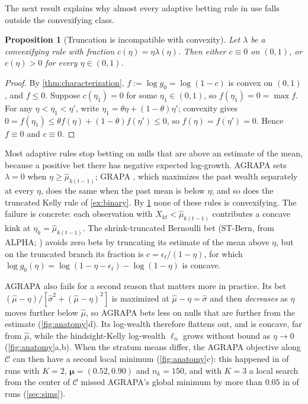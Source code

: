 \documentclass[11pt]{article}
\newcommand{\bs}{\boldsymbol}
\newcommand{\calC}{\mathcal{C}}
\theoremstyle{plain}
\newtheorem{proposition}[theorem]{Proposition}
\theoremstyle{definition}
\theoremstyle{remark}
\begin{document}
The next result explains why almost every adaptive betting rule in use falls outside the convexifying class.

\begin{proposition}[Truncation is incompatible with convexity]\label{prop:truncation}
Let $\lambda$ be a convexifying rule with fraction $c(\eta)=\eta\lambda(\eta)$.  Then either $c\equiv0$ on $(0,1)$, or
$c(\eta)>0$ for every $\eta\in(0,1)$.
\end{proposition}

\begin{proof}
By \cref{thm:characterization}, $f := \log g_0 = \log(1-c)$ is convex on $(0,1)$, and $f\le0$.  Suppose $c(\eta_1)=0$
for some $\eta_1\in(0,1)$, so $f(\eta_1)=0=\max f$.  For any $\eta<\eta_1<\eta'$, write $\eta_1=\theta\eta+(1-\theta)\eta'$;
convexity gives $0=f(\eta_1)\le\theta f(\eta)+(1-\theta)f(\eta')\le0$, so $f(\eta)=f(\eta')=0$.  Hence $f\equiv0$ and
$c\equiv0$.
\end{proof}

Most adaptive rules stop betting on nulls that are above an estimate of the mean, because a positive bet there has
negative expected log-growth.  AGRAPA \citep{waudbysmith2024estimating} sets $\lambda=0$ when
$\eta\ge\hat\mu_{k(t-1)}$; GRAPA \citep{kumon2011sequential, waudbysmith2024estimating}, which maximizes the past
wealth separately at every $\eta$, does the same when the past mean is below $\eta$; and so does the truncated Kelly
rule of \cref{ex:binary}.  By \cref{prop:truncation} none of these rules is convexifying.  The failure is concrete:
each observation with $X_{kt}<\hat\mu_{k(t-1)}$ contributes a concave kink at $\eta_k=\hat\mu_{k(t-1)}$.  The
shrink-truncated Bernoulli bet (ST-Bern, from ALPHA; \citealp{stark2023alpha}) avoids zero bets by truncating its
estimate of the mean above $\eta$, but on the truncated branch its fraction is $c=\epsilon_t/(1-\eta)$, for which
$\log g_0(\eta)=\log(1-\eta-\epsilon_t)-\log(1-\eta)$ is concave.

AGRAPA also fails for a second reason that matters more in practice.  Its bet
$(\hat\mu-\eta)/[\hat\sigma^2+(\hat\mu-\eta)^2]$ is maximized at $\hat\mu-\eta=\hat\sigma$ and then \emph{decreases} as
$\eta$ moves further below $\hat\mu$, so AGRAPA bets less on nulls that are further from the estimate
(\cref{fig:anatomy}d).  Its log-wealth therefore flattens out, and is concave, far from $\hat\mu$, while the
hindsight-Kelly log-wealth $\ell_n$ grows without bound as $\eta\to0$ (\cref{fig:anatomy}a,b).  When the stratum means
differ, the AGRAPA objective along $\calC$ can then have a second local minimum (\cref{fig:anatomy}c): this happened in
\agrapalocalminshare{} of \repsE{} runs with $K=2$, $\bs\mu=(0.52,0.90)$ and $n_k=150$, and with $K=3$ a local search from
the center of $\calC$ missed AGRAPA's global minimum by more than $0.05$ in \agrapamissshare{} of runs
(\cref{sec:sims}).
\end{document}
